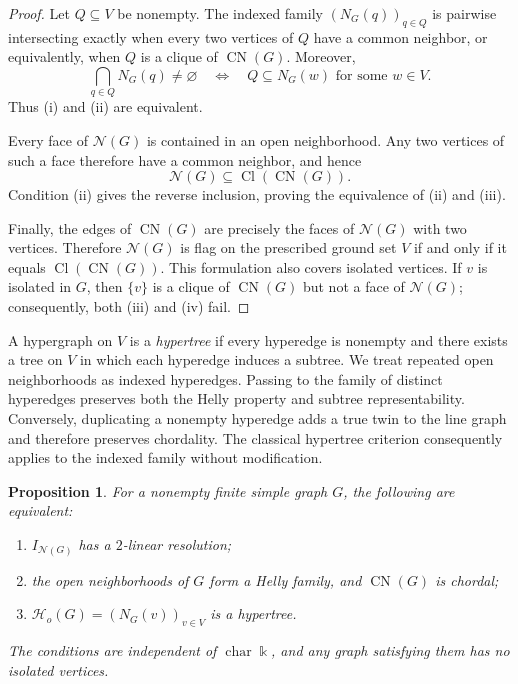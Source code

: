 \documentclass[10pt,a4paper]{amsart}
\newtheorem{proposition}[theorem]{Proposition}
\numberwithin{equation}{section}
\newcommand{\NN}{\mathcal N}
\newcommand{\Ho}{\mathcal H_{\!o}}
\newcommand{\Cl}{\operatorname{Cl}}
\newcommand{\CN}{\operatorname{CN}}
\begin{document}
	\begin{proof}
		Let \(Q\subseteq V\) be nonempty. The indexed family
		\((N_G(q))_{q\in Q}\) is pairwise intersecting exactly when every two
		vertices of \(Q\) have a common neighbor, or equivalently, when \(Q\) is a
		clique of \(\CN(G)\). Moreover,
		\[
		\bigcap_{q\in Q}N_G(q)\ne\varnothing
		\quad\Longleftrightarrow\quad
		Q\subseteq N_G(w)\text{ for some }w\in V.
		\]
		Thus \textup{(i)} and \textup{(ii)} are equivalent.
		
		Every face of \(\NN(G)\) is contained in an open neighborhood. Any two
		vertices of such a face therefore have a common neighbor, and hence
		\[
		\NN(G)\subseteq\Cl(\CN(G)).
		\]
		Condition \textup{(ii)} gives the reverse inclusion, proving the equivalence
		of \textup{(ii)} and \textup{(iii)}.
		
		Finally, the edges of \(\CN(G)\) are precisely the faces of \(\NN(G)\)
		with two vertices. Therefore \(\NN(G)\) is flag on the prescribed ground set
		\(V\) if and only if it equals \(\Cl(\CN(G))\). This formulation also covers
		isolated vertices. If \(v\) is isolated in \(G\), then \(\{v\}\) is a
		clique of \(\CN(G)\) but not a face of \(\NN(G)\); consequently, both
		\textup{(iii)} and \textup{(iv)} fail.
	\end{proof}
	
	A hypergraph on \(V\) is a \emph{hypertree} if every hyperedge is nonempty and
	there exists a tree on \(V\) in which each hyperedge induces a subtree. We
	treat repeated open neighborhoods as indexed hyperedges. Passing to the family
	of distinct hyperedges preserves both the Helly property and subtree
	representability. Conversely, duplicating a nonempty hyperedge adds a true twin
	to the line graph and therefore preserves chordality. The classical hypertree
	criterion consequently applies to the indexed family without modification.
	
	\begin{proposition}\label{prop:background}
		For a nonempty finite simple graph \(G\), the following are equivalent:
		\begin{enumerate}[label=\textup{(\roman*)}]
			\item \(I_{\NN(G)}\) has a \(2\)-linear resolution;
			\item the open neighborhoods of \(G\) form a Helly family, and \(\CN(G)\) is chordal;
			\item \(\Ho(G)=(N_G(v))_{v\in V}\) is a hypertree.
		\end{enumerate}
		The conditions are independent of \(\operatorname{char}\Bbbk\), and any
		graph satisfying them has no isolated vertices.
	\end{proposition}
	
\end{document}
